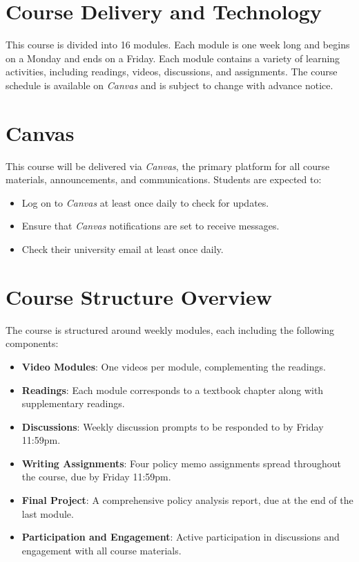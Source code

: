 \documentclass[12pt, letterpaper]{article}
\begin{document}
\section*{Course Delivery and Technology}

This course is divided into 16 modules. Each module is one week long and begins on a Monday and ends on a Friday. Each module contains a variety of learning activities, including readings, videos, discussions, and assignments. The course schedule is available on \emph{Canvas} and is subject to change with advance notice.
\section*{Canvas}

This course will be delivered via \emph{Canvas}, the primary platform for all course materials, announcements, and communications. Students are expected to:
\begin{itemize}
    \item Log on to \emph{Canvas} at least once daily to check for updates.
    \item Ensure that \emph{Canvas} notifications are set to receive messages.
    \item Check their university email at least once daily.
\end{itemize}

\section*{Course Structure Overview}

The course is structured around weekly modules, each including the following components:
\begin{itemize}
    \item \textbf{Video Modules}: One videos per module, complementing the readings.
    \item \textbf{Readings}: Each module corresponds to a textbook chapter along with supplementary readings.
    \item \textbf{Discussions}: Weekly discussion prompts to be responded to by Friday 11:59pm.
    \item \textbf{Writing Assignments}: Four policy memo assignments spread throughout the course, due by Friday 11:59pm.
    \item \textbf{Final Project}: A comprehensive policy analysis report, due at the end of the last module.
    \item \textbf{Participation and Engagement}: Active participation in discussions and engagement with all course materials.
\end{itemize}
\end{document}
